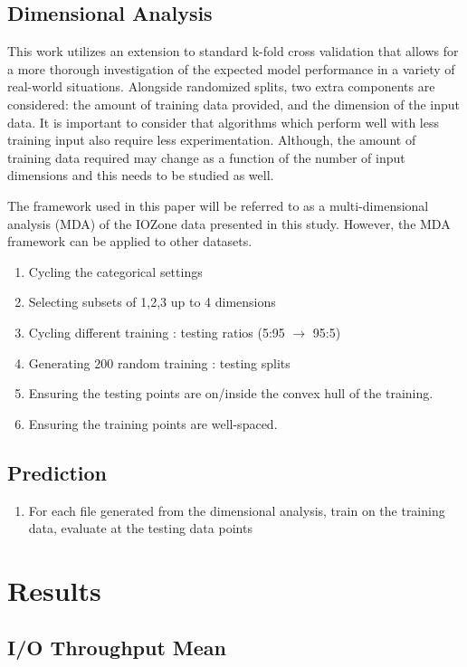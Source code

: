 \documentclass{scspaperproc}
\theoremstyle{scsthe}
\begin{document}
\subsection{Dimensional Analysis}
This work utilizes an extension to standard k-fold cross validation
that allows for a more thorough investigation of the expected model
performance in a variety of real-world situations. Alongside
randomized splits, two extra components are considered: the amount of
training data provided, and the dimension of the input data. It is
important to consider that algorithms which perform well with less
training input also require less experimentation. Although, the amount
of training data required may change as a function of the number of
input dimensions and this needs to be studied as well.

The framework used in this paper will be referred to as a
multi-dimensional analysis (MDA) of the IOZone data presented in this
study. However, the MDA framework can be applied to other datasets.

\begin{enumerate}
\item Cycling the categorical settings
\item Selecting subsets of 1,2,3 up to 4 dimensions
\item Cycling different training : testing ratios (5:95 $\rightarrow$ 95:5)
\item Generating 200 random training : testing splits
\item Ensuring the testing points are on/inside the convex hull of the training.
\item Ensuring the training points are well-spaced.
\end{enumerate}

\subsection{Prediction}
\begin{enumerate}
\item For each file generated from the dimensional analysis, train on
  the training data, evaluate at the testing data points
\end{enumerate}


\section{Results}
\subsection{I/O Throughput Mean}
\end{document}
